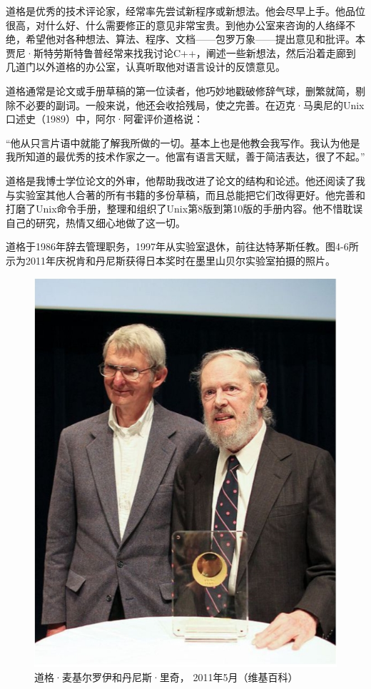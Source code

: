 \documentclass[a4paper,12pt,UTF8,twoside]{ctexbook}
\begin{document}
道格是优秀的技术评论家，经常率先尝试新程序或新想法。他会尽早上手。他品位很高，对什么好、什么需要修正的意见非常宝贵。到他办公室来咨询的人络绎不绝，希望他对各种想法、算法、程序、文档——包罗万象——提出意见和批评。本贾尼·斯特劳斯特鲁普经常来找我讨论C++，阐述一些新想法，然后沿着走廊到几道门以外道格的办公室，认真听取他对语言设计的反馈意见。

道格通常是论文或手册草稿的第一位读者，他巧妙地戳破修辞气球，删繁就简，剔除不必要的副词。一般来说，他还会收拾残局，使之完善。在迈克·马奥尼的Unix口述史（1989）中，阿尔·阿霍评价道格说：

“他从只言片语中就能了解我所做的一切。基本上也是他教会我写作。我认为他是我所知道的最优秀的技术作家之一。他富有语言天赋，善于简洁表达，很了不起。”

道格是我博士学位论文的外审，他帮助我改进了论文的结构和论述。他还阅读了我与实验室其他人合著的所有书籍的多份草稿，而且总能把它们改得更好。他完善和打磨了Unix命令手册，整理和组织了Unix第8版到第10版的手册内容。他不惜耽误自己的研究，热情又细心地做了这一切。

道格于1986年辞去管理职务，1997年从实验室退休，前往达特茅斯任教。图4-6所示为2011年庆祝肯和丹尼斯获得日本奖时在墨里山贝尔实验室拍摄的照片。

\begin{figure}[htbp]
	\centering
	\includegraphics[width=0.7\linewidth]{39}
	\caption{道格·麦基尔罗伊和丹尼斯·里奇， 2011年5月（维基百科）}
	\label{fig:1}
\end{figure}
\end{document}
